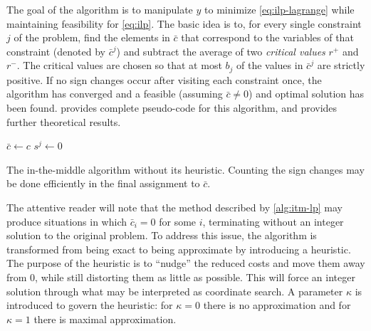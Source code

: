 The goal of the algorithm is to manipulate \(y\) to minimize \eqref{eq:ilp-lagrange} while maintaining feasibility for \eqref{eq:ilp}.
The basic idea is to, for every single constraint \(j\) of the problem, find the elements in \(\bar{c}\) that correspond to the variables of that constraint (denoted by \(\bar{c}^j\)) and subtract the average of two \emph{critical values} \(r^+\) and \(r^-\).
The critical values are chosen so that at most \(b_j\) of the values in \(\bar{c}^j\) are strictly positive.
If no sign changes occur after visiting each constraint once, the algorithm has converged and a feasible (assuming \(\bar{c} \neq 0\)) and optimal solution has been found.
 provides complete pseudo-code for this algorithm, and \textcites{Wedelin95}{Wedelin13} provides further theoretical results.

\begin{algorithm}[p]
	\(\bar{c} \leftarrow c\) \;
	\(s^j \leftarrow 0\) \;

	\caption{
		The in-the-middle algorithm without its heuristic.
		Counting the sign changes may be done efficiently in the final assignment to \(\bar{c}\).
	}
	\label{alg:itm-lp}
\end{algorithm}

The attentive reader will note that the method described by \cref{alg:itm-lp} may produce situations in which \(\bar{c}_i = 0\) for some \(i\), terminating without an integer solution to the original problem.
To address this issue, the algorithm is transformed from being exact to being approximate by introducing a heuristic.
The purpose of the heuristic is to \enquote{nudge} the reduced costs and move them away from \(0\), while still distorting them as little as possible.
This will force an integer solution through what may be interpreted as coordinate search.
A parameter \(\kappa\) is introduced to govern the heuristic: for \(\kappa=0\) there is no approximation and for \(\kappa=1\) there is maximal approximation.

